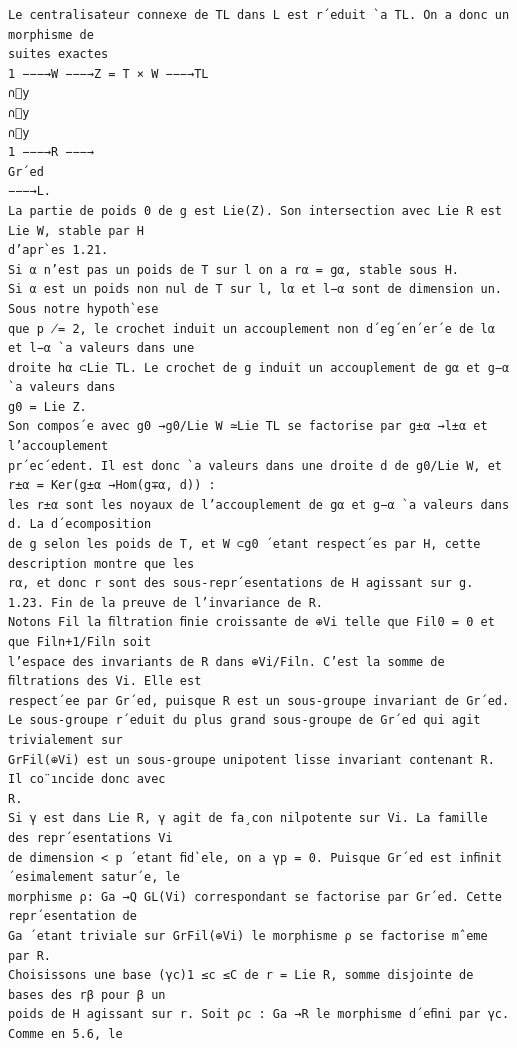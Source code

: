 \documentclass[10pt]{article}
\begin{document}
\begin{verbatim}
Le centralisateur connexe de TL dans L est r´eduit `a TL. On a donc un morphisme de
suites exactes
1 −−−→W −−−→Z = T × W −−−→TL
∩y
∩y
∩y
1 −−−→R −−−→
Gr´ed
−−−→L.
La partie de poids 0 de g est Lie(Z). Son intersection avec Lie R est Lie W, stable par H
d’apr`es 1.21.
Si α n’est pas un poids de T sur l on a rα = gα, stable sous H.
Si α est un poids non nul de T sur l, lα et l−α sont de dimension un. Sous notre hypoth`ese
que p ̸= 2, le crochet induit un accouplement non d´eg´en´er´e de lα et l−α `a valeurs dans une
droite hα ⊂Lie TL. Le crochet de g induit un accouplement de gα et g−α `a valeurs dans
g0 = Lie Z.
Son compos´e avec g0 →g0/Lie W ≃Lie TL se factorise par g±α →l±α et l’accouplement
pr´ec´edent. Il est donc `a valeurs dans une droite d de g0/Lie W, et
r±α = Ker(g±α →Hom(g∓α, d)) :
les r±α sont les noyaux de l’accouplement de gα et g−α `a valeurs dans d. La d´ecomposition
de g selon les poids de T, et W ⊂g0 ´etant respect´es par H, cette description montre que les
rα, et donc r sont des sous-repr´esentations de H agissant sur g.
1.23. Fin de la preuve de l’invariance de R.
Notons Fil la ﬁltration ﬁnie croissante de ⊕Vi telle que Fil0 = 0 et que Filn+1/Filn soit
l’espace des invariants de R dans ⊕Vi/Filn. C’est la somme de ﬁltrations des Vi. Elle est
respect´ee par Gr´ed, puisque R est un sous-groupe invariant de Gr´ed.
Le sous-groupe r´eduit du plus grand sous-groupe de Gr´ed qui agit trivialement sur
GrFil(⊕Vi) est un sous-groupe unipotent lisse invariant contenant R. Il co¨ıncide donc avec
R.
Si γ est dans Lie R, γ agit de fa¸con nilpotente sur Vi. La famille des repr´esentations Vi
de dimension < p ´etant ﬁd`ele, on a γp = 0. Puisque Gr´ed est inﬁnit´esimalement satur´e, le
morphisme ρ: Ga →Q GL(Vi) correspondant se factorise par Gr´ed. Cette repr´esentation de
Ga ´etant triviale sur GrFil(⊕Vi) le morphisme ρ se factorise mˆeme par R.
Choisissons une base (γc)1 ≤c ≤C de r = Lie R, somme disjointe de bases des rβ pour β un
poids de H agissant sur r. Soit ρc : Ga →R le morphisme d´eﬁni par γc. Comme en 5.6, le


\end{verbatim}
\end{document}
